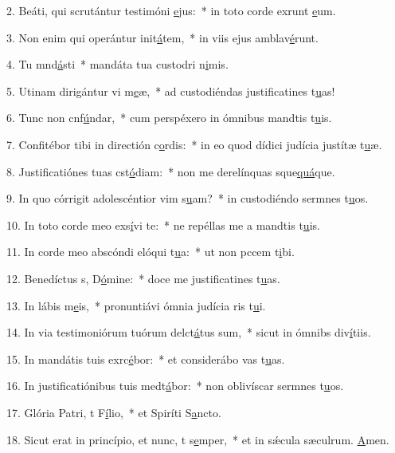 2. Beáti, qui scrutántur testimóni \uline{e}jus:~* in toto corde exrunt \uline{e}um.\par 
3. Non enim qui operántur init\uline{á}tem,~* in viis ejus amblav\uline{é}runt.\par 
4. Tu mnd\uline{á}sti~* mandáta tua custodri n\uline{i}mis.\par 
5. Utinam dirigántur vi m\uline{e}æ,~* ad custodiéndas justificatines t\uline{u}as!\par 
6. Tunc non cnf\uline{ú}ndar,~* cum perspéxero in ómnibus mandtis t\uline{u}is.\par 
7. Confitébor tibi in directión c\uline{o}rdis:~* in eo quod dídici judícia justítæ t\uline{u}æ.\par 
8. Justificatiónes tuas cst\uline{ó}diam:~* non me derelínquas sque\uline{quá}que.\par 
9. In quo córrigit adolescéntior vim s\uline{u}am?~* in custodiéndo sermnes t\uline{u}os.\par 
10. In toto corde meo exs\uline{í}vi te:~* ne repéllas me a mandtis t\uline{u}is.\par 
11. In corde meo abscóndi elóqui t\uline{u}a:~* ut non pccem t\uline{i}bi.\par 
12. Benedíctus s, D\uline{ó}mine:~* doce me justificatines t\uline{u}as.\par 
13. In lábis m\uline{e}is,~* pronuntiávi ómnia judícia ris t\uline{u}i.\par 
14. In via testimoniórum tuórum delct\uline{á}tus sum,~* sicut in ómnibs div\uline{í}tiis.\par 
15. In mandátis tuis exrc\uline{é}bor:~* et considerábo vas t\uline{u}as.\par 
16. In justificatiónibus tuis medt\uline{á}bor:~* non oblivíscar sermnes t\uline{u}os.\par 
17. Glória Patri, t F\uline{í}lio,~* et Spiríti S\uline{a}ncto.\par 
18. Sicut erat in princípio, et nunc, t s\uline{e}mper,~* et in sǽcula sæculrum. \uline{A}men.\par 
